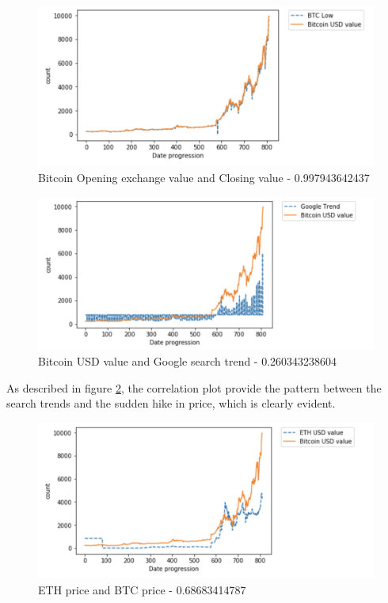 \documentclass[sigconf]{acmart}
\begin{document}
\begin{figure}[!ht]
  \centering\includegraphics[width=\columnwidth]{PROJECT/images/low.png}
  \caption{Bitcoin Opening exchange value and Closing value - 0.997943642437}
  \label{4}
\end{figure}


\begin{figure}[!ht]
  \centering\includegraphics[width=\columnwidth]{PROJECT/images/googletrend.png}
  \caption{Bitcoin USD value and Google search trend - 0.260343238604}
  \label{5}
\end{figure}

As described in figure \ref{5}, the correlation plot provide the pattern between the search trends and the sudden hike in price, which is clearly evident.

\begin{figure}[!ht]
  \centering\includegraphics[width=\columnwidth]{PROJECT/images/ethvalue.png}
  \caption{ETH price and BTC price - 0.68683414787 }
  \label{6}
\end{figure}
\end{document}
